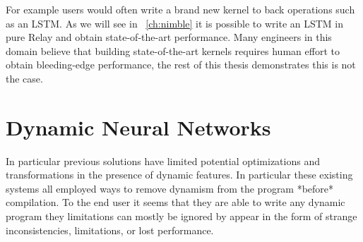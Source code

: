 For example users would often write a brand new kernel to back operations such
  as an LSTM.
As we will see in ~\ref{ch:nimble} it is possible to write an LSTM in pure Relay
  and obtain state-of-the-art performance.
Many engineers in this domain believe that building state-of-the-art kernels requires
  human effort to obtain bleeding-edge performance, the rest of this thesis demonstrates
  this is not the case.



\section{Dynamic Neural Networks}

In particular previous solutions have limited potential optimizations
  and transformations in the presence of dynamic features.
In particular these existing systems all employed ways to remove
  dynamism from the program *before* compilation.
To the end user it seems that they are able to write any dynamic
  program they limitations can mostly be ignored by appear in
  the form of strange inconsistencies, limitations, or lost performance.

